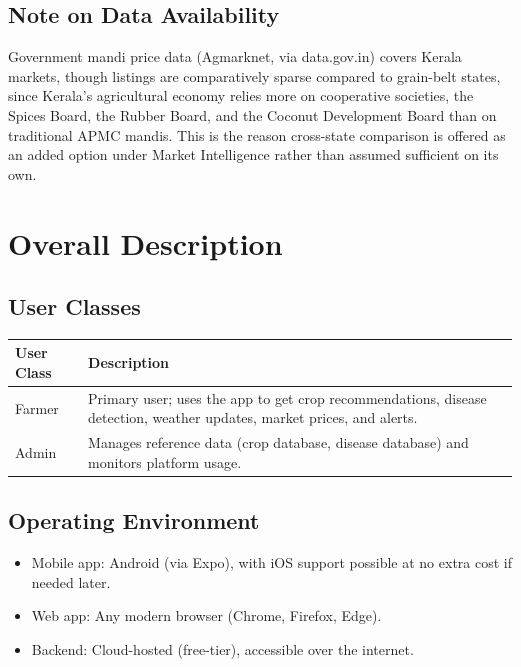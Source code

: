 \documentclass[12pt,a4paper]{article}
\begin{document}
\subsection{Note on Data Availability}
Government mandi price data (Agmarknet, via data.gov.in) covers Kerala markets, though listings are comparatively sparse compared to grain-belt states, since Kerala's agricultural economy relies more on cooperative societies, the Spices Board, the Rubber Board, and the Coconut Development Board than on traditional APMC mandis. This is the reason cross-state comparison is offered as an added option under Market Intelligence rather than assumed sufficient on its own.

\section{Overall Description}

\subsection{User Classes}
\begin{longtable}{p{3.5cm} p{10.5cm}}
\toprule
\textbf{User Class} & \textbf{Description} \\
\midrule
\endhead
Farmer & Primary user; uses the app to get crop recommendations, disease detection, weather updates, market prices, and alerts. \\
Admin & Manages reference data (crop database, disease database) and monitors platform usage. \\
\bottomrule
\end{longtable}

\subsection{Operating Environment}
\begin{itemize}[leftmargin=*]
    \item Mobile app: Android (via Expo), with iOS support possible at no extra cost if needed later.
    \item Web app: Any modern browser (Chrome, Firefox, Edge).
    \item Backend: Cloud-hosted (free-tier), accessible over the internet.
\end{itemize}
\end{document}
